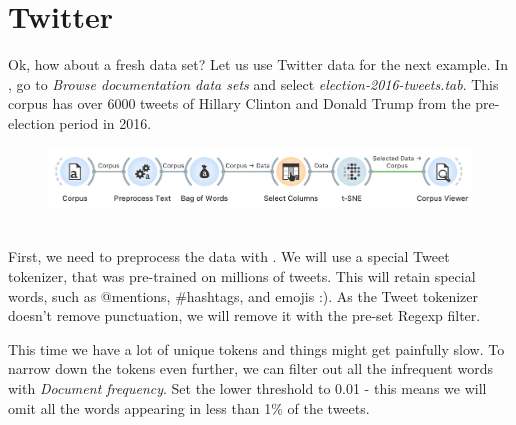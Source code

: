 \chapter{Twitter}

Ok, how about a fresh data set? Let us use Twitter data for the next example. In , go to \emph{Browse documentation data sets} and select \emph{election-2016-tweets.tab}. This corpus has over 6000 tweets of Hillary Clinton and Donald Trump from the pre-election period in 2016.

\vspace{-0.2cm}
\begin{figure}[h]
  \centering
  \includegraphics[width=\linewidth]{workflow.png}%
  \caption{$\;$}
\end{figure}
\vspace{-0.3cm}

First, we need to preprocess the data with . We will use a special Tweet tokenizer, that was pre-trained on millions of tweets. This will retain special words, such as @mentions, \#hashtags, and emojis :). As the Tweet tokenizer doesn't remove punctuation, we will remove it with the pre-set Regexp filter.

This time we have a lot of unique tokens and things might get painfully slow. To narrow down the tokens even further, we can filter out all the infrequent words with \emph{Document frequency}. Set the lower threshold to 0.01 - this means we will omit all the words appearing in less than 1\% of the tweets.

